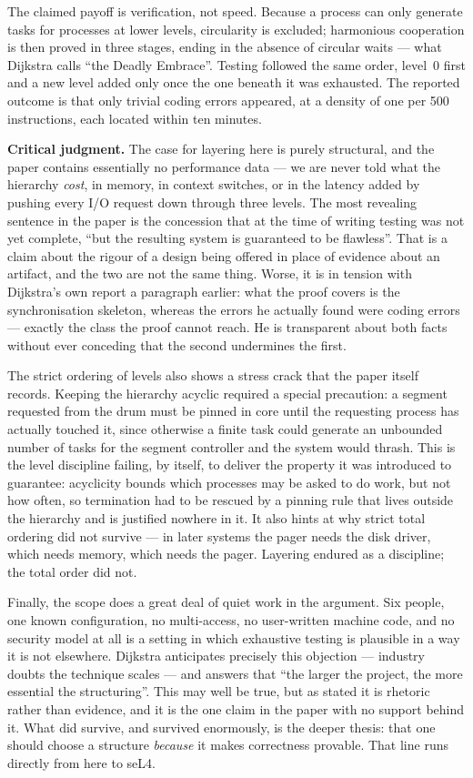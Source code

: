 The claimed payoff is verification, not speed. Because a process can only generate tasks for
processes at lower levels, circularity is excluded; harmonious cooperation is then proved in
three stages, ending in the absence of circular waits --- what Dijkstra calls ``the Deadly
Embrace''. Testing followed the same order, level~0 first and a new level added only once
the one beneath it was exhausted. The reported outcome is that only trivial coding errors
appeared, at a density of one per 500 instructions, each located within ten minutes.

\textbf{Critical judgment.}
The case for layering here is purely structural, and the paper contains essentially no
performance data --- we are never told what the hierarchy \emph{cost}, in memory, in
context switches, or in the latency added by pushing every I/O request down through three
levels. The most revealing sentence in the paper is the concession that at the time of
writing testing was not yet complete, ``but the resulting system is guaranteed to be
flawless''. That is a claim about the rigour of a design being offered in place of evidence
about an artifact, and the two are not the same thing. Worse, it is in tension with
Dijkstra's own report a paragraph earlier: what the proof covers is the synchronisation
skeleton, whereas the errors he actually found were coding errors --- exactly the class the
proof cannot reach. He is transparent about both facts without ever conceding that the
second undermines the first.

The strict ordering of levels also shows a stress crack that the paper itself records.
Keeping the hierarchy acyclic required a special precaution: a segment requested from the
drum must be pinned in core until the requesting process has actually touched it, since
otherwise a finite task could generate an unbounded number of tasks for the segment
controller and the system would thrash. This is the level discipline failing, by itself, to
deliver the property it was introduced to guarantee: acyclicity bounds which processes may
be asked to do work, but not how often, so termination had to be rescued by a pinning rule
that lives outside the hierarchy and is justified nowhere in it. It also hints at why strict
total ordering did not survive --- in later systems the pager needs the disk driver, which
needs memory, which needs the pager. Layering endured as a discipline; the total order did
not.

Finally, the scope does a great deal of quiet work in the argument. Six people, one known
configuration, no multi-access, no user-written machine code, and no security model at all
is a setting in which exhaustive testing is plausible in a way it is not elsewhere. Dijkstra
anticipates precisely this objection --- industry doubts the technique scales --- and answers
that ``the larger the project, the more essential the structuring''. This may well be true,
but as stated it is rhetoric rather than evidence, and it is the one claim in the paper with
no support behind it. What did survive, and survived enormously, is the deeper thesis: that
one should choose a structure \emph{because} it makes correctness provable. That line runs
directly from here to seL4.

